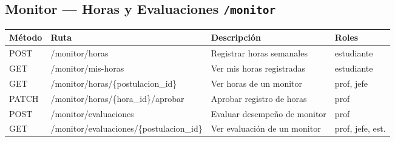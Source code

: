 \documentclass[12pt,a4paper]{article}
\begin{document}
\subsection{Monitor — Horas y Evaluaciones \texttt{/monitor}}
\begin{longtable}{>{\ttfamily}p{1.5cm} >{\ttfamily}p{6cm} p{4.5cm} p{2cm}}
  \toprule
  \textbf{Método} & \textbf{Ruta} & \textbf{Descripción} & \textbf{Roles} \\
  \midrule
  POST   & /monitor/horas & Registrar horas semanales & estudiante \\
  GET    & /monitor/mis-horas & Ver mis horas registradas & estudiante \\
  GET    & /monitor/horas/\{postulacion\_id\} & Ver horas de un monitor & prof, jefe \\
  PATCH  & /monitor/horas/\{hora\_id\}/aprobar & Aprobar registro de horas & prof \\
  POST   & /monitor/evaluaciones & Evaluar desempeño de monitor & prof \\
  GET    & /monitor/evaluaciones/\{postulacion\_id\} & Ver evaluación de un monitor & prof, jefe, est. \\
  \bottomrule
\end{longtable}

\end{document}
